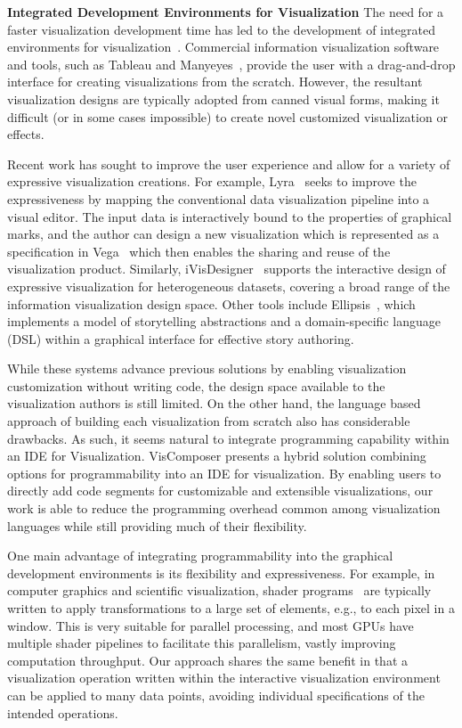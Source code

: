 \noindent \textbf{Integrated Development Environments for Visualization} The need for a faster visualization development time has led to the development of integrated environments for visualization~\cite{Silva:2005:VIS,Lee:2013:TVCG,Myers:1994:CHI}.  Commercial information visualization software and tools, such as Tableau and Manyeyes~\cite{Viegas:2007:TVCG}, provide the user with a drag-and-drop interface for creating visualizations from the scratch. However, the resultant visualization designs are typically adopted from canned visual forms, making it difficult (or in some cases impossible) to create novel customized visualization or effects.

Recent work has sought to improve the user experience and allow for a variety of expressive visualization creations.  For example, Lyra~\cite{Heer:2014:CGF} seeks to improve the expressiveness  by mapping the conventional data visualization  pipeline into a visual editor. The input data is interactively bound to the properties of graphical marks, and the author can design a new visualization which is represented as a specification in Vega~\cite{Vega} which then enables  the sharing and reuse of the visualization product. Similarly, iVisDesigner~\cite{Yuan:2014:TVCG} supports the interactive design of expressive visualization for heterogeneous datasets, covering a broad range of the information visualization design space.
Other tools include Ellipsis~\cite{Heer:2014:Ellipsis}, which implements a model of storytelling abstractions and a domain-specific language (DSL)  within a graphical interface for effective story authoring.

While these systems advance previous solutions by enabling visualization customization without writing code, the design space available to the visualization authors is still limited. On the other hand, the language based approach of building each visualization from scratch also has considerable drawbacks.  As such, it seems natural to integrate programming capability within an IDE for Visualization.  VisComposer presents a hybrid solution combining options for programmability into an IDE for visualization.  By enabling users to directly add code segments for customizable and extensible visualizations, our work is able to reduce the programming overhead common among visualization languages while still providing much of their flexibility.


One main advantage of integrating programmability into the graphical development environments is its flexibility and expressiveness. For example, in computer graphics and scientific visualization, shader programs~\cite{RTVG,OpenGLSL} are typically written to apply transformations to a large set of elements, e.g., to each pixel in a window. This is very suitable for parallel processing, and most GPUs have multiple shader pipelines to facilitate this parallelism, vastly improving computation throughput. Our approach shares the same benefit in that a visualization operation written within the interactive visualization environment can be applied to many data points, avoiding individual specifications of the intended operations.
